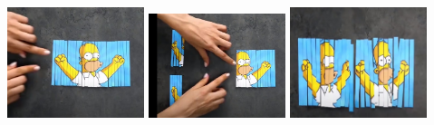\documentclass{article}
\begin{document}
\includegraphics[width=4cm]{recorte1.jpeg}
\includegraphics[width=4cm]{recorte2.jpeg}
\includegraphics[width=4cm]{recorte3.jpeg}
\end{document}
